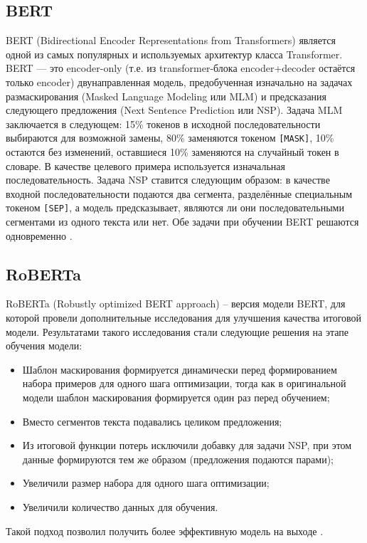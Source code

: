 \subsection{BERT}
BERT (Bidirectional Encoder Representations from Transformers) является одной из самых популярных и используемых архитектур класса Transformer. BERT — это encoder-only (т.е. из transformer-блока encoder+decoder остаётся только encoder) двунаправленная модель, предобученная изначально на задачах размаскирования (Masked Language Modeling или MLM) и предсказания следующего предложения (Next Sentence Prediction или NSP).
Задача MLM заключается в следующем: 15\% токенов в исходной последовательности выбираются для возможной замены, 80\% заменяются токеном \texttt{[MASK]}, 10\% остаются без изменений, оставшиеся 10\% заменяются на случайный токен в словаре. В качестве целевого примера используется изначальная последовательность. Задача NSP ставится следующим образом: в качестве входной последовательности подаются два сегмента, разделённые специальным токеном \texttt{[SEP]}, а модель предсказывает, являются ли они последовательными сегментами из одного текста или нет. Обе задачи при обучении BERT решаются одновременно \cite{bert}.

\subsection{RoBERTa}
RoBERTa (Robustly optimized BERT approach) – версия модели BERT, для которой провели дополнительные исследования для улучшения качества итоговой модели. Результатами такого исследования стали следующие решения на этапе обучения модели:
\begin{itemize}
    \item Шаблон маскирования формируется динамически перед формированием набора примеров для одного шага оптимизации, тогда как в оригинальной модели шаблон маскирования формируется один раз перед обучением;
    \item Вместо сегментов текста подавались целиком предложения;
    \item Из итоговой функции потерь исключили добавку для задачи NSP, при этом данные формируются тем же образом (предложения подаются парами);
    \item Увеличили размер набора для одного шага оптимизации;
    \item Увеличили количество данных для обучения.
\end{itemize}
Такой подход позволил получить более эффективную модель на выходе \cite{roberta}.

